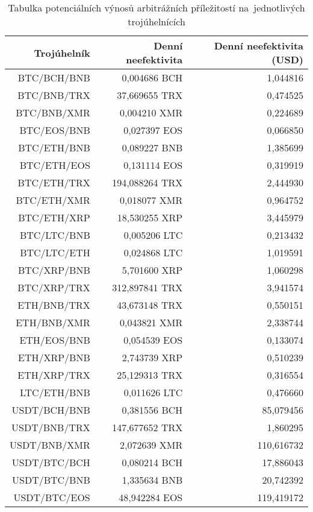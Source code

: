 \begin{table}\centering
\caption{Tabulka potenciálních výnosů arbitrážních příležitostí na~jednotlivých trojúhelnících}
\label{table_gains}
\begin{tabular}{|| r | r | r ||}\hline Trojúhelník & Denní neefektivita & Denní neefektivita (USD)\\ [0.5ex]
 \hline\hline BTC/BCH/BNB & 0,004686 BCH & 1,044816\\ 
 \hline BTC/BNB/TRX & 37,669655 TRX & 0,474525\\ 
 \hline BTC/BNB/XMR & 0,004210 XMR & 0,224689\\ 
 \hline BTC/EOS/BNB & 0,027397 EOS & 0,066850\\ 
 \hline BTC/ETH/BNB & 0,089227 BNB & 1,385699\\ 
 \hline BTC/ETH/EOS & 0,131114 EOS & 0,319919\\ 
 \hline BTC/ETH/TRX & 194,088264 TRX & 2,444930\\ 
 \hline BTC/ETH/XMR & 0,018077 XMR & 0,964752\\ 
 \hline BTC/ETH/XRP & 18,530255 XRP & 3,445979\\ 
 \hline BTC/LTC/BNB & 0,005206 LTC & 0,213432\\ 
 \hline BTC/LTC/ETH & 0,024868 LTC & 1,019591\\ 
 \hline BTC/XRP/BNB & 5,701600 XRP & 1,060298\\ 
 \hline BTC/XRP/TRX & 312,897841 TRX & 3,941574\\ 
 \hline ETH/BNB/TRX & 43,673148 TRX & 0,550151\\ 
 \hline ETH/BNB/XMR & 0,043821 XMR & 2,338744\\ 
 \hline ETH/EOS/BNB & 0,054539 EOS & 0,133074\\ 
 \hline ETH/XRP/BNB & 2,743739 XRP & 0,510239\\ 
 \hline ETH/XRP/TRX & 25,129313 TRX & 0,316554\\ 
 \hline LTC/ETH/BNB & 0,011626 LTC & 0,476660\\ 
 \hline USDT/BCH/BNB & 0,381556 BCH & 85,079456\\ 
 \hline USDT/BNB/TRX & 147,677652 TRX & 1,860295\\ 
 \hline USDT/BNB/XMR & 2,072639 XMR & 110,616732\\ 
 \hline USDT/BTC/BCH & 0,080214 BCH & 17,886043\\ 
 \hline USDT/BTC/BNB & 1,335634 BNB & 20,742392\\ 
 \hline USDT/BTC/EOS & 48,942284 EOS & 119,419172\\ 

\end{tabular}
\end{table}
